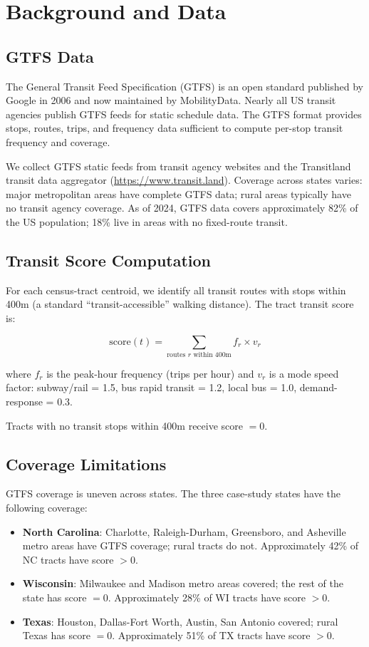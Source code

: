 \section{Background and Data}

\subsection{GTFS Data}

The General Transit Feed Specification (GTFS) is an open standard published by Google in 2006 and now maintained by MobilityData. Nearly all US transit agencies publish GTFS feeds for static schedule data. The GTFS format provides stops, routes, trips, and frequency data sufficient to compute per-stop transit frequency and coverage.

We collect GTFS static feeds from transit agency websites and the Transitland transit data aggregator (\url{https://www.transit.land}). Coverage across states varies: major metropolitan areas have complete GTFS data; rural areas typically have no transit agency coverage. As of 2024, GTFS data covers approximately 82\% of the US population; 18\% live in areas with no fixed-route transit.

\subsection{Transit Score Computation}

For each census-tract centroid, we identify all transit routes with stops within 400m (a standard ``transit-accessible'' walking distance). The tract transit score is:

\[
  \text{score}(t) = \sum_{\text{routes } r \text{ within 400m}} f_r \times v_r
\]

where $f_r$ is the peak-hour frequency (trips per hour) and $v_r$ is a mode speed factor: subway/rail = 1.5, bus rapid transit = 1.2, local bus = 1.0, demand-response = 0.3.

Tracts with no transit stops within 400m receive score $= 0$.

\subsection{Coverage Limitations}

GTFS coverage is uneven across states. The three case-study states have the following coverage:
\begin{itemize}
  \item \textbf{North Carolina}: Charlotte, Raleigh-Durham, Greensboro, and Asheville metro areas have GTFS coverage; rural tracts do not. Approximately 42\% of NC tracts have score $> 0$.
  \item \textbf{Wisconsin}: Milwaukee and Madison metro areas covered; the rest of the state has score $= 0$. Approximately 28\% of WI tracts have score $> 0$.
  \item \textbf{Texas}: Houston, Dallas-Fort Worth, Austin, San Antonio covered; rural Texas has score $= 0$. Approximately 51\% of TX tracts have score $> 0$.
\end{itemize}

